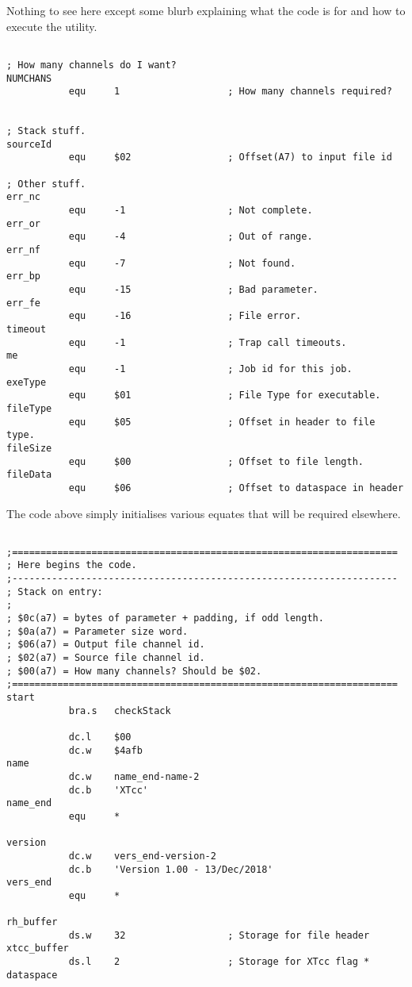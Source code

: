 Nothing to see here except some blurb explaining what the code is for and how to execute the utility.


\begin{lstlisting}[firstnumber=last,caption={XTcc - Equates}]

; How many channels do I want?
NUMCHANS
           equ     1                   ; How many channels required?


; Stack stuff.
sourceId
           equ     $02                 ; Offset(A7) to input file id

; Other stuff.
err_nc
           equ     -1                  ; Not complete.
err_or
           equ     -4                  ; Out of range.
err_nf
           equ     -7                  ; Not found.
err_bp
           equ     -15                 ; Bad parameter.
err_fe
           equ     -16                 ; File error.
timeout
           equ     -1                  ; Trap call timeouts.
me
           equ     -1                  ; Job id for this job.
exeType
           equ     $01                 ; File Type for executable.
fileType
           equ     $05                 ; Offset in header to file type.
fileSize
           equ     $00                 ; Offset to file length.
fileData
           equ     $06                 ; Offset to dataspace in header
\end{lstlisting}

The code above simply initialises various equates that will be required elsewhere.


\begin{lstlisting}[firstnumber=last,caption={XTcc - Job Start}]

;====================================================================
; Here begins the code.
;--------------------------------------------------------------------
; Stack on entry:
;
; $0c(a7) = bytes of parameter + padding, if odd length.
; $0a(a7) = Parameter size word.
; $06(a7) = Output file channel id.
; $02(a7) = Source file channel id.
; $00(a7) = How many channels? Should be $02.
;====================================================================
start
           bra.s   checkStack

           dc.l    $00
           dc.w    $4afb
name
           dc.w    name_end-name-2
           dc.b    'XTcc'
name_end
           equ     *

version
           dc.w    vers_end-version-2
           dc.b    'Version 1.00 - 13/Dec/2018'
vers_end
           equ     *

rh_buffer
           ds.w    32                  ; Storage for file header
xtcc_buffer
           ds.l    2                   ; Storage for XTcc flag * dataspace
\end{lstlisting}

